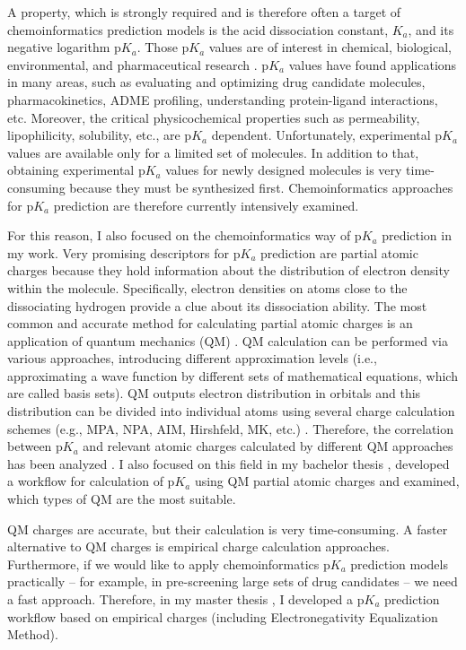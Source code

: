 A property, which is strongly required and is therefore often a target of
che\-mo\-info\-rma\-tics prediction models is the acid dissociation constant, $K_a$,
and its negative logarithm p$K_a$. Those p$K_a$ values are of interest
in chemical, biological, environmental, and pharmaceutical research 
\cite{Comer2001, Klebe2000, Kim2007}.
p$K_a$ values have found applications in many areas, such as evaluating and
optimizing drug candidate molecules, pharmacokinetics, ADME proﬁling,
understanding protein-ligand interactions, etc. Moreover, the critical
physicochemical properties such as permeability, lipophilicity, solubility,
etc., are p$K_a$ dependent. Unfortunately, experimental p$K_a$ values are
available only for a limited set of molecules. In addition to that, obtaining
experimental p$K_a$ values for newly designed molecules is very time-consuming
because they must be synthesized first. Chemoinformatics approaches for p$K_a$
prediction are therefore currently intensively examined.

For this reason, I also focused on the chemoinformatics way of p$K_a$
prediction in my work. Very promising descriptors for p$K_a$ prediction are
partial atomic charges \cite{Citra1999, Gross2002, Zhang2006, Kreye2009,
Svobodova2011, Svobodova2013} because they hold information about the distribution
of electron density within the molecule. Specifically, electron densities on
atoms close to the dissociating hydrogen provide a clue about its dissociation
ability. The most common and accurate method for calculating partial atomic
charges is an application of quantum mechanics (QM) \cite{Cramer2005}. QM calculation can be
performed via various approaches, introducing different approximation levels
(i.e., approximating a wave function by different sets of mathematical
equations, which are called basis sets). QM outputs electron distribution
in orbitals and this distribution can be divided into individual atoms using
several charge calculation schemes (e.g., MPA, NPA, AIM, Hirshfeld, MK, etc.) \cite{Cramer2005}.
Therefore, the correlation between p$K_a$ and relevant atomic charges
calculated by different QM approaches has been analyzed \cite{Svobodova2011}.
I also focused on this field in my bachelor thesis \cite{Geidl2011}, developed
a workflow for calculation of p$K_a$ using QM partial atomic charges and
examined, which types of QM are the most suitable.

QM charges are accurate, but their calculation is very time-consuming. A faster
alternative to QM charges is empirical charge calculation approaches.
Furthermore, if we would like to apply chemoinformatics p$K_a$ prediction models
practically -- for example, in pre-screening large sets of drug candidates -- we
need a fast approach. Therefore, in my master thesis \cite{Geidl2013},
I developed a p$K_a$ prediction workflow based on empirical charges (including
Electronegativity Equalization Method).

